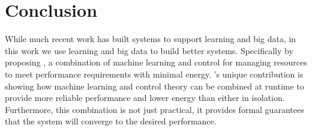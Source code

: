 \section{Conclusion}
While much recent work has built systems to support learning and big
data, in this work we use learning and big data to build better
systems.  Specifically by proposing \SYSTEM{}, a combination of
machine learning and control for managing resources to meet
performance requirements with minimal energy.  \SYSTEM{}'s unique
contribution is showing how machine learning and control theory can be
combined at runtime to provide more reliable performance and lower
energy than either in isolation.  Furthermore, this combination is not
just practical, it provides formal guarantees that the system will
converge to the desired performance.
